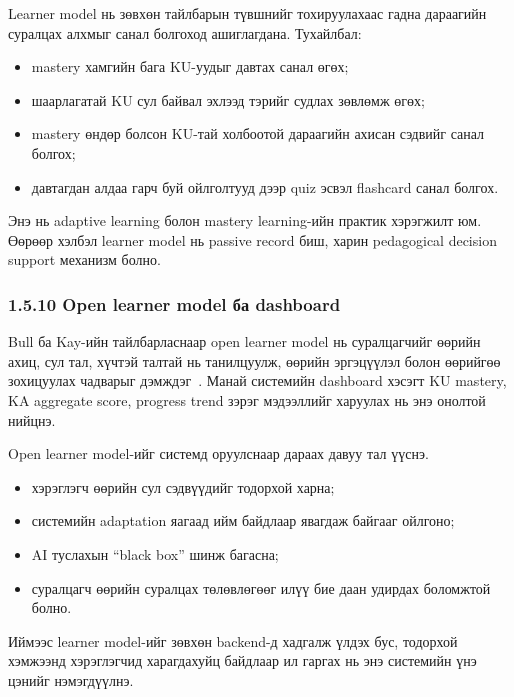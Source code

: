 \documentclass[12pt,A4]{report}
\begin{document}
Learner model нь зөвхөн тайлбарын түвшнийг тохируулахаас гадна дараагийн суралцах алхмыг санал болгоход ашиглагдана. Тухайлбал:

\begin{itemize}
    \item mastery хамгийн бага KU-уудыг давтах санал өгөх;
    \item шаарлагатай KU сул байвал эхлээд тэрийг судлах зөвлөмж өгөх;
    \item mastery өндөр болсон KU-тай холбоотой дараагийн ахисан сэдвийг санал болгох;
    \item давтагдан алдаа гарч буй ойлголтууд дээр quiz эсвэл flashcard санал болгох.
\end{itemize}

Энэ нь adaptive learning болон mastery learning-ийн практик хэрэгжилт юм. Өөрөөр хэлбэл learner model нь passive record биш, харин pedagogical decision support механизм болно.

\subsubsection{1.5.10 Open learner model ба dashboard}

Bull ба Kay-ийн тайлбарласнаар open learner model нь суралцагчийг өөрийн ахиц, сул тал, хүчтэй талтай нь танилцуулж, өөрийн эргэцүүлэл болон өөрийгөө зохицуулах чадварыг дэмждэг~\cite{bull2010,kay1997}. Манай системийн dashboard хэсэгт KU mastery, KA aggregate score, progress trend зэрэг мэдээллийг харуулах нь энэ онолтой нийцнэ.

Open learner model-ийг системд оруулснаар дараах давуу тал үүснэ.

\begin{itemize}
    \item хэрэглэгч өөрийн сул сэдвүүдийг тодорхой харна;
    \item системийн adaptation яагаад ийм байдлаар явагдаж байгааг ойлгоно;
    \item AI туслахын ``black box'' шинж багасна;
    \item суралцагч өөрийн суралцах төлөвлөгөөг илүү бие даан удирдах боломжтой болно.
\end{itemize}

Иймээс learner model-ийг зөвхөн backend-д хадгалж үлдэх бус, тодорхой хэмжээнд хэрэглэгчид харагдахуйц байдлаар ил гаргах нь энэ системийн үнэ цэнийг нэмэгдүүлнэ.

\end{document}
